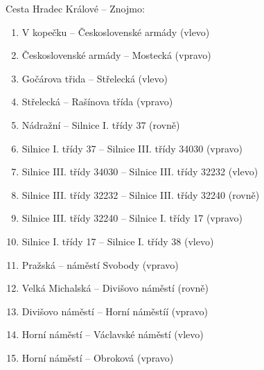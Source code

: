 \documentclass[a4paper]{article}
\begin{document}
Cesta Hradec Králové -- Znojmo:
\begin{enumerate}

\item V kopečku -- Československé armády (vlevo)
\item Československé armády -- Mostecká (vpravo)
\item Gočárova třida -- Střelecká (vlevo)
\item Střelecká -- Rašínova třída (vpravo)
\item Nádražní -- Silnice I. třídy 37 (rovně)
\item Silnice I. třídy 37 -- Silnice III. třídy 34030 (vpravo)
\item Silnice III. třídy 34030 -- Silnice III. třídy 32232 (vlevo)
\item Silnice III. třídy 32232 -- Silnice III. třídy 32240 (rovně)
\item Silnice III. třídy 32240 -- Silnice I. třídy 17 (vpravo)
\item Silnice I. třídy 17 -- Silnice I. třídy 38 (vlevo)
\item Pražská -- náměstí Svobody (vpravo)
\item Velká Michalská -- Divišovo náměstí (rovně)
\item Divišovo náměstí -- Horní náměstíí (vpravo)
\item Horní náměstí -- Václavské náměstí (vlevo)
\item Horní náměstí -- Obroková (vpravo)

\end{enumerate}
\end{document}
